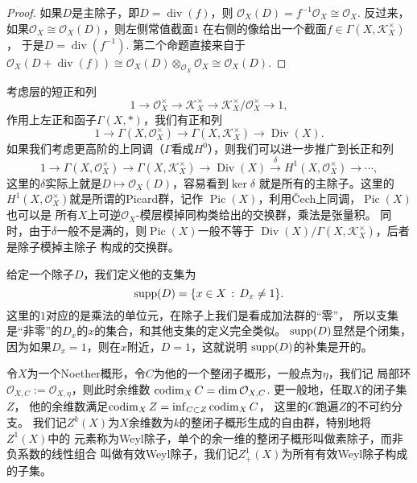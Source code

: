 \begin{proof}
    如果$D$是主除子，即$D=\operatorname{div}(f)$，则
    $\mathcal O_X(D)=f^{-1}\mathcal O_X\cong \mathcal O_X$.
    反过来，如果$\mathcal O_X\cong \mathcal O_X(D)$，则左侧常值截面$1$
    在右侧的像给出一个截面$f\in \Gamma(X,\mathcal K_X^\times)$，
    于是$D=\operatorname{div}(f^{-1})$. 第二个命题直接来自于
    $\mathcal O_X(D+\operatorname{div}(f))\cong 
    \mathcal O_X(D)\otimes_{\mathcal O_X} \mathcal O_X\cong \mathcal O_X(D)$.
\end{proof}

考虑层的短正和列
\[
    1\to \mathcal O_X^\times \to \mathcal K_X^\times \to
    \mathcal K_X^\times/\mathcal O_X^\times \to 1,
\]
作用上左正和函子$\Gamma(X,*)$，我们有正和列
\[
    1\to \Gamma(X,\mathcal O_X^\times) \to \Gamma(X,\mathcal K_X^\times) \to
    \operatorname{Div}(X).
\]
如果我们考虑更高阶的上同调（$\Gamma$看成$H^0$），则我们可以进一步推广到长正和列
\[
    1\to \Gamma(X,\mathcal O_X^\times) \to \Gamma(X,\mathcal K_X^\times) \to
    \operatorname{Div}(X)\xrightarrow{\delta} H^1(X,\mathcal O_X^\times)
    \to \cdots,
\]
这里的$\delta$实际上就是$D\mapsto \mathcal O_X(D)$，容易看到$\ker \delta$
就是所有的主除子。这里的$H^1(X,\mathcal O_X^\times)$就是所谓的Picard群，记作
$\operatorname{Pic}(X)$，利用\v{C}ech上同调，$\operatorname{Pic}(X)$也可以是
所有$X$上可逆$\mathcal O_X$-模层模掉同构类给出的交换群，乘法是张量积。
同时，由于$\delta$一般不是满的，则$\operatorname{Pic}(X)$一般不等于
$\operatorname{Div}(X)/\Gamma(X,\mathcal K_X^\times)$，后者是除子模掉主除子
构成的交换群。

\begin{para}[支集]
    给定一个除子$D$，我们定义他的支集为
    \[
        \operatorname{supp}(D)=\{x\in X\,:\,D_x \neq 1\}.
    \]
    这里的$1$对应的是乘法的单位元，在除子上我们是看成加法群的“零”，
    所以支集是“非零”的$D_x$的$x$的集合，和其他支集的定义完全类似。
    $\operatorname{supp}(D)$显然是个闭集，因为如果$D_x=1$，则在$x$附近，$D=1$，这就说明
    $\operatorname{supp}(D)$的补集是开的。
\end{para}

\begin{para}[Weyl除子]
令$X$为一个Noether概形，令$C$为他的一个整闭子概形，一般点为$\eta$，我们记
局部环$\mathcal O_{X,C}:=\mathcal O_{X,\eta}$，则此时余维数
$\operatorname{codim}_X C=\dim \mathcal O_{X,C}$. 更一般地，任取$X$的闭子集$Z$，
他的余维数满足$\operatorname{codim}_X Z=\inf_{C\subset Z} \operatorname{codim}_X C$，
这里的$C$跑遍$Z$的不可约分支。
我们记$Z^k(X)$为$X$余维数为$k$的整闭子概形生成的自由群，特别地将$Z^1(X)$中的
元素称为Weyl除子，单个的余一维的整闭子概形叫做素除子，而非负系数的线性组合
叫做有效Weyl除子，我们记$Z^1_+(X)$为所有有效Weyl除子构成的子集。
\end{para}

